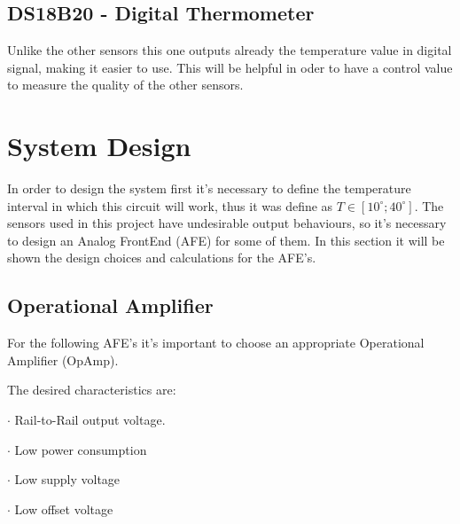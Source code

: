 \documentclass[12pt]{article}
\begin{document}
\subsection{DS18B20 - Digital Thermometer}

    Unlike the other sensors this one outputs already the temperature value in digital signal, making it easier to use. This will be helpful in oder to have a control value to measure the quality of the other sensors.

\newpage
\section{System Design}

    In order to design the system first it's necessary to define the temperature interval in which this circuit will work, thus it was define as $T \in [ 10^{\circ}; 40^{\circ} ]$. 
    The sensors used in this project have undesirable output behaviours, so it's necessary to design an Analog FrontEnd (AFE) for some of them. In this section it will be shown the design choices and calculations for the AFE's.

\subsection{Operational Amplifier}
          

    For the following AFE's it's important to choose an appropriate Operational Amplifier (OpAmp). 

    The desired characteristics are:

    $\cdot$ Rail-to-Rail output voltage.
    
    $\cdot$ Low power consumption
    
    $\cdot$ Low supply voltage

    $\cdot$ Low offset voltage
\end{document}
